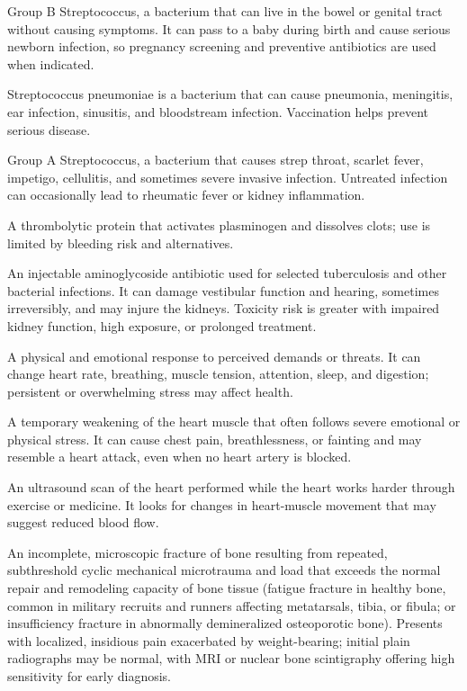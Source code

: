  Group B Streptococcus, a bacterium that can live in the bowel or genital tract without causing symptoms. It can pass to a baby during birth and cause serious newborn infection, so pregnancy screening and preventive antibiotics are used when indicated.

 Streptococcus pneumoniae is a bacterium that can cause pneumonia, meningitis, ear infection, sinusitis, and bloodstream infection. Vaccination helps prevent serious disease.

 Group A Streptococcus, a bacterium that causes strep throat, scarlet fever, impetigo, cellulitis, and sometimes severe invasive infection. Untreated infection can occasionally lead to rheumatic fever or kidney inflammation.

 A thrombolytic protein that activates plasminogen and dissolves clots; use is limited by bleeding risk and alternatives.

 An injectable aminoglycoside antibiotic used for selected tuberculosis and other
bacterial infections. It can damage vestibular function and hearing, sometimes irreversibly, and may
injure the kidneys. Toxicity risk is greater with impaired kidney function, high exposure, or prolonged
treatment.

 A physical and emotional response to perceived demands or threats. It can change heart rate, breathing, muscle tension, attention, sleep, and digestion; persistent or overwhelming stress may affect health.

 A temporary weakening of the heart muscle that often follows severe emotional or physical stress. It can cause chest pain, breathlessness, or fainting and may resemble a heart attack, even when no heart artery is blocked.

 An ultrasound scan of the heart performed while the heart works harder through exercise or medicine. It looks for changes in heart-muscle movement that may suggest reduced blood flow.

 An incomplete, microscopic fracture of bone resulting from repeated, subthreshold cyclic mechanical microtrauma and load that exceeds the normal repair and remodeling capacity of bone tissue (fatigue fracture in healthy bone, common in military recruits and runners affecting metatarsals, tibia, or fibula; or insufficiency fracture in abnormally demineralized osteoporotic bone). Presents with localized, insidious pain exacerbated by weight-bearing; initial plain radiographs may be normal, with MRI or nuclear bone scintigraphy offering high sensitivity for early diagnosis.

